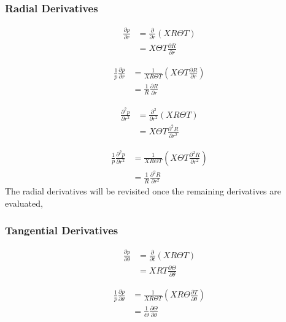 \subsubsection{Radial Derivatives}
\begin{align*}
    \frac{\partial p}{\partial r} 
    &=
    \frac{\partial }{\partial r}  \left( XR\Theta T \right) \\
    &=
    X\Theta T\frac{\partial R}{\partial r}  
\end{align*}


\begin{align*}
    \frac{1}{p}\frac{\partial p}{\partial r} 
    &=
    \frac{ 1}{X R \Theta T}  \left( X\Theta T\frac{\partial R}{\partial r} \right) \\
    &=\frac{ 1}{ R}\frac{\partial R}{\partial r}  
\end{align*}

\begin{align*}
    \frac{\partial^2 p}{\partial r^2} 
    &=
    \frac{\partial^2 }{\partial r^2}  \left( XR\Theta T \right) \\
    &=
    X\Theta T\frac{\partial^2 R}{\partial r^2}  
\end{align*}


\begin{align*}
    \frac{1}{p}\frac{\partial^2 p}{\partial r^2} 
    &=
    \frac{ 1}{X R \Theta T}  \left( X\Theta T \frac{\partial^2 R}{\partial r^2} \right) \\
    &=\frac{ 1}{ R}\frac{\partial^2 R}{\partial r^2}  
\end{align*}
The radial derivatives will be revisited once the remaining derivatives are evaluated,

\subsubsection{Tangential Derivatives}

\begin{align*}
    \frac{\partial p}{\partial \theta } 
    &=
    \frac{\partial }{\partial t}  \left( XR\Theta T \right) \\
    &=
    XRT\frac{\partial \Theta}{\partial \theta}  
\end{align*}


\begin{align*}
    \frac{1}{p}\frac{\partial p}{\partial \theta} 
    &=
    \frac{ 1}{X R \Theta T}  \left( XR\Theta\frac{\partial T}{\partial \theta} \right) \\
    &=\frac{ 1}{ \Theta}\frac{\partial \Theta}{\partial \theta}  
\end{align*}


